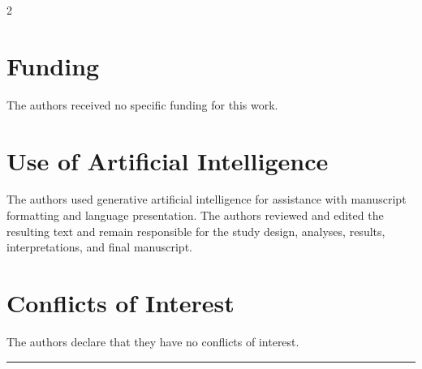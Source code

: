 \documentclass{book}
\begin{document}
\begin{multicols}{2}
\section*{Funding}
The authors received no specific funding for this work.

\section*{Use of Artificial Intelligence}
The authors used generative artificial intelligence for assistance with manuscript formatting and language presentation. The authors reviewed and edited the resulting text and remain responsible for the study design, analyses, results, interpretations, and final manuscript.

\section*{Conflicts of Interest}
The authors declare that they have no conflicts of interest.

\parskip=5pt
\noindent \rule[0pt]{25em}{1pt}


\end{multicols}
\end{document}
